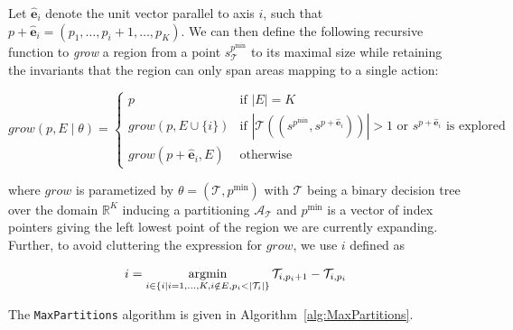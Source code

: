 Let $\mathbf{\hat{e}}_i$ denote the unit vector parallel to axis $i$, such that
$p + \mathbf{\hat{e}}_i = (p_1,\ldots,p_i + 1,\ldots,p_K)$. We can then define
the following recursive function to \textit{grow} a region from a point
$s^{p^{\min}}_{\mathcal{T}}$ to its maximal size while retaining the invariants
that the region can only span areas mapping to a single action:

\[
    grow(p, E \mid \theta) = 
    \begin{cases}
        p & \text{if } |E|  =  K \\
        grow(p, E \cup \{i\}) &
            \text{if }
                |\mathcal{T}((s^{p^{\min}}, s^{p + \mathbf{\hat{e}}_i}))| > 1
                \text{~or $s^{p + \mathbf{\hat{e}}_i}$ is explored} \\
        grow(p + \mathbf{\hat{e}}_i, E) & \text{otherwise}
    \end{cases}
\] 

\noindent where $grow$ is parametized by $\theta = (\mathcal{T}, p^{\min})$ with
$\mathcal{T}$ being a binary decision tree over the domain $\mathbb{R}^K$
inducing a partitioning $\mathcal{A}_{\mathcal{T}}$ and $p^{\min}$ is
a vector of index pointers giving the left lowest point of the region we are
currently expanding. Further, to avoid cluttering the expression for $grow$,
we use $i$ defined as

\begin{align*}
    i &= \operatorname*{argmin}_{i \in \{ i \mid i = 1,\ldots,K, i \notin E, p_i <
    |\mathcal{T}_i| \}}
        \mathcal{T}_{i,p_i+1} - \mathcal{T}_{i,p_i} \\
\end{align*}

\noindent
The \texttt{MaxPartitions} algorithm is given in
Algorithm~\ref{alg:MaxPartitions}.





